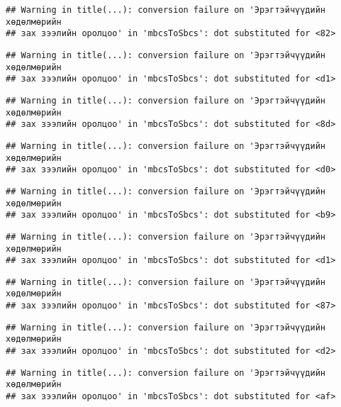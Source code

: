 \documentclass[]{article}
\begin{document}
\begin{verbatim}
## Warning in title(...): conversion failure on 'Эрэгтэйчүүдийн хөдөлмөрийн
## зах зээлийн оролцоо' in 'mbcsToSbcs': dot substituted for <82>
\end{verbatim}

\begin{verbatim}
## Warning in title(...): conversion failure on 'Эрэгтэйчүүдийн хөдөлмөрийн
## зах зээлийн оролцоо' in 'mbcsToSbcs': dot substituted for <d1>
\end{verbatim}

\begin{verbatim}
## Warning in title(...): conversion failure on 'Эрэгтэйчүүдийн хөдөлмөрийн
## зах зээлийн оролцоо' in 'mbcsToSbcs': dot substituted for <8d>
\end{verbatim}

\begin{verbatim}
## Warning in title(...): conversion failure on 'Эрэгтэйчүүдийн хөдөлмөрийн
## зах зээлийн оролцоо' in 'mbcsToSbcs': dot substituted for <d0>
\end{verbatim}

\begin{verbatim}
## Warning in title(...): conversion failure on 'Эрэгтэйчүүдийн хөдөлмөрийн
## зах зээлийн оролцоо' in 'mbcsToSbcs': dot substituted for <b9>
\end{verbatim}

\begin{verbatim}
## Warning in title(...): conversion failure on 'Эрэгтэйчүүдийн хөдөлмөрийн
## зах зээлийн оролцоо' in 'mbcsToSbcs': dot substituted for <d1>
\end{verbatim}

\begin{verbatim}
## Warning in title(...): conversion failure on 'Эрэгтэйчүүдийн хөдөлмөрийн
## зах зээлийн оролцоо' in 'mbcsToSbcs': dot substituted for <87>
\end{verbatim}

\begin{verbatim}
## Warning in title(...): conversion failure on 'Эрэгтэйчүүдийн хөдөлмөрийн
## зах зээлийн оролцоо' in 'mbcsToSbcs': dot substituted for <d2>
\end{verbatim}

\begin{verbatim}
## Warning in title(...): conversion failure on 'Эрэгтэйчүүдийн хөдөлмөрийн
## зах зээлийн оролцоо' in 'mbcsToSbcs': dot substituted for <af>
\end{verbatim}
\end{document}
